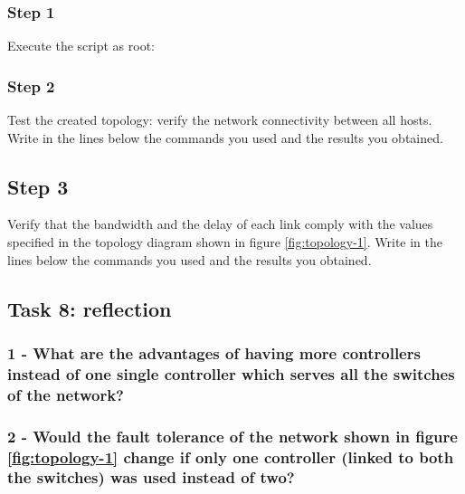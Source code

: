 \subsubsection*{Step 1}
Execute the script as root: \\

\subsubsection*{Step 2}
Test the created topology: verify the network connectivity between all hosts.
Write in the lines below the commands you used and the results you obtained.

\hrulefill

\hrulefill

\hrulefill

\hrulefill

\subsection*{Step 3}
Verify that the bandwidth and the delay of each link comply with the values
specified in the topology diagram shown in figure \ref{fig:topology-1}.
Write in the lines below the commands you used and the results you obtained.

\hrulefill

\hrulefill

\hrulefill

\hrulefill




\subsection*{Task 8: reflection}
\subsubsection*{1 - What are the advantages of having more controllers instead of one
single controller which serves all the switches of the network?}
\hrulefill

\hrulefill

\hrulefill

\hrulefill

\subsubsection*{2 - Would the fault tolerance of the network shown in figure \ref{fig:topology-1}
change if only one controller (linked to both the switches) was used
instead of two?}
\hrulefill

